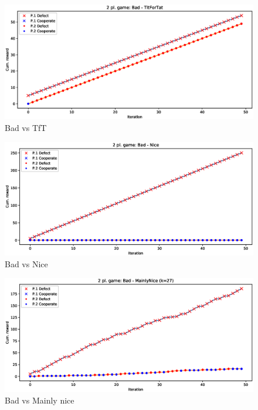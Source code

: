 \documentclass[journal,a4paper,10pt,twoside,draft=false]{IEEEtran}
\begin{document}
\begin{figure}[ht]
    \centering
    \includegraphics[width=1\columnwidth]{../img/ipd2p/ipd2p-rewards-Bad-TitForTat}
    \caption{Bad vs TfT}
    \label{fig:badvstft}
\end{figure}

\begin{figure}[ht]
    \centering
    \includegraphics[width=1\columnwidth]{../img/ipd2p/ipd2p-rewards-Bad-Nice}
    \caption{Bad vs Nice}
    \label{fig:badvsnice}
\end{figure}

\begin{figure}[ht]
    \centering
    \includegraphics[width=1\columnwidth]{../img/ipd2p/ipd2p-rewards-Bad-MainlyNice(k=27)}
    \caption{Bad vs Mainly nice}
    \label{fig:badvsmainlynice}
\end{figure}
\end{document}
